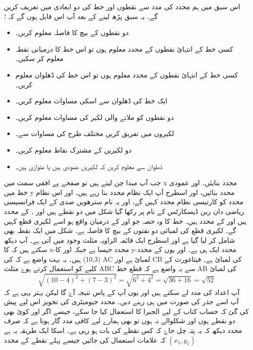  اس سبق میں ہم محدد کی مدد سے نقطوں اور خط کی   دو ابعادی میں تعریف کریں گے۔ یہ سبق پڑھ لینے کے بعد آپ اس قابل ہوں گے کہ ؛
\begin{itemize}
\item   
دو نقطوں کے بیچ کا فاصلہ معلوم کریں۔
\item
کسی خط کے انتہائ نقطوں کے محدد معلوم ہوں تو اس خط کا درمیانی نقطہ معلوم کر سکیں۔
\item
کسی خط کے انتہائ نقطوں کے محدد معلوم ہوں تو اس خط کی ڈھلوان معلوم کریں۔
\item
ایک خط کی ڈھلوان سے اسکی مساوات معلوم کریں۔
\item
دو نقطوں کو ملانے والی لکیر کی مساوات معلوم کریں۔
\item
لکیروں میں تفریق کریں مختلف طرح کی مساوات سے۔
\item
دو لکیریں کے مشترک نقاط  معلوم کریں۔
\item
ڈھلوان سے معلوم کریں کہ لکیریں عمودی ہیں یا متوازی ہیں۔ 
\end{itemize}
جب آپ مبدا چن لیتے ہیں تو صفحے پے افقی سمت میں x محدد بنایئں۔ اور عمودی خط میں y محدد بنائیں، اور اسطرح آپ ایک نظام محدد بنا رہے ہیں۔ اور اس نظام محدد کو کارتیسی نظام محدد کہیں گے، اور یہ نام سترھویں صدی کے  ایک فرانسیسی ریاضی دان رین ڈیسکارٹس  کے نام پر رکھا گیا
 شکل    میں دو نقطے ہیں   اور ۔   کے محدد  ہیں اور   کے    محدد ہیں۔  خط کا وہ حصہ جو     اور       کے درمیان واقع ہو اسے لکیری قطع کہیں گے۔ لکیری قطع کی لمبائی  دو نقتوں کے بیچ کا فاصلہ ہے۔
شکل   میں ایک نقطہ      بھی شامل کر لیا گیا ہے اور اسطرح ایک قائمہ الزاویہ مثلث وجود میں آتی ہے۔ آپ دیکھ سکتے ہیں کہ     کا  x-محدد     جیسا ہے جبکہ     اور      کا y-محدد ایک ہی ہے۔  اور یوں  کے   محدد  (10,3) ہیں۔
یہ بہت واضع ہے کہ   کی AC لمبائ      ہے اور    CB  کی لمبائ    ہے۔ فیثاغورث کے کلیے کو استعمال کرتے ہوۓ  مثلث ABC    سے یہ واضع ہے کہ قطع خط  AB کی لمبائ \[ \sqrt{(10-4)^2 + (7-3)^2} = \sqrt{6^2 + 4^2} = \sqrt{36+16} = \sqrt{52}
\] 
 آپ اعداد کی مدد لے سکتے ہیں اور یوں آپ کے پاس نتیجہ      آۓ گا لیکن بہتر یہی ہے کہ آپ اسے جذر کی صورت میں ہی رہنے دیں۔
 محدد جیومیٹری کی تجویز اس لیے پیش کی گئ کہ حساب کتاب کے لیے الجبرا کا استعمال کیا جا سکے، جیسے اگر      اور      کوئ بھی دو نقطے ہوں اور شکلوالے نہ ہوں تو بھی ہمارے لیے کافی مدد گار ہوتا ہے کہ صرف محدد دیکھ کہ یہ پتہ چل جاۓ کہ کس نقطے کی بات ہو رہی ہے۔ اسکا ایک طریقہ یہ ہے کہ علامات استعمال کی جائیں جیسے پہلے نقطے کے محدد   \((x_{1},y_{1})\)
